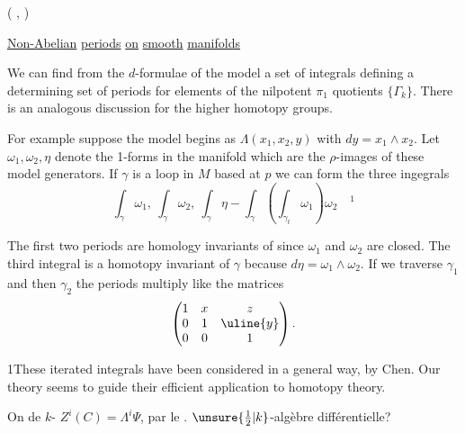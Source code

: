 (   ,
  
)

\uline{Non-Abelian} \uline{periods} \uline{on} \uline{smooth} \uline{manifolds}

We can find from the $d$-formulae of the model a set
of integrals defining a determining set of periods for
elements of the nilpotent $\pi_1$ quotients $\{\Gamma_k\}$. There is an
analogous discussion for the higher homotopy groups.

For example suppose the model begins as $\Lambda(x_1,x_2,y)$
with $dy=x_1\wedge x_2$. Let $\omega_1,\omega_2,\eta$ denote the 1-forms in
the manifold which are the $\rho$-images of these model generators.
If $\gamma$ is a loop in $M$ based at $p$ we can form the three
ingegrals
\[
\int_\gamma\omega_1,\ \int_\gamma\omega_2,\
\int_\gamma\eta-\int_\gamma\left(\int_{\gamma_t}\omega_1\right)\omega_2
\quad{}^1
\]

The first two periods are homology invariants of
since $\omega_1$ and $\omega_2$ are closed. The third integral is a
homotopy invariant of $\gamma$ because $d\eta=\omega_1\wedge\omega_2$. If we
traverse $\gamma_1$ and then $\gamma_2$ the periods multiply like the
matrices
\[
\begin{pmatrix}1&x&z\\0&1&\uline{y}\\0&0&1\end{pmatrix}.
\]


1\quad These iterated integrals have been considered in
a general way, by Chen. Our theory seems to guide
their efficient application to homotopy theory.

\deleted{\[
\unsure{Z^iC^j}=\Lambda^i\Psi\times\Lambda^{j+1}\Phi
\longrightarrow\unsure{C^{i+j}}=\Lambda^{i+j+1}\Phi
\]}

On  de $k$-
 $Z^i(C)=\Lambda^i\Psi$, par le
. 
 $\unsure{\frac12|k}$-algèbre différentielle?

